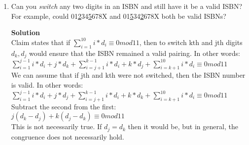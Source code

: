 \documentclass[11pt]{article}
\newenvironment{Parts}{\begin{enumerate}[label=(\alph*)]}{\end{enumerate}}
\newcommand*{\Part}{\item}
\begin{document}
\begin{Parts}
  \Part Can you \textit{switch} any two digits in an ISBN and still have it be a valid ISBN? For example, could 01\underline{2}34\underline{5}678X and 01\underline{5}34\underline{2}678X both be valid ISBNs?
  \begin{mdframed} \textbf{Solution} \\
Claim states that if $\sum_{i=1}^10 i*d_i \equiv 0mod11$, then to switch kth and jth digits $d_k, d_j$ would ensure that the ISBN remained a valid pairing. In other words: \\
$\sum_{i=1}^{j-1} i*d_i + j*d_k + \sum_{i=j+1}^{k-1} i*d_i + k*d_j + \sum_{i=k+1}^10 i*d_i \equiv 0mod11$ \\
We can assume that if jth and kth were not switched, then the ISBN number is valid. In other words: \\
$\sum_{i=1}^{j-1} i*d_i + j*d_j + \sum_{i=j+1}^{k-1} i*d_i + k*d_k + \sum_{i=k+1}^10 i*d_i \equiv 0mod11$ \\
Subtract the second from the first: \\
$j(d_k-d_j)+k(d_j-d_k) \equiv 0mod11$ \\
This is not necessarily true. If $d_j=d_k$ then it would be, but in general, the congruence does not necessarily hold. 
\end{mdframed}
  
\end{Parts}
\end{document}
